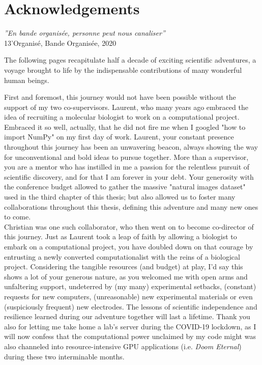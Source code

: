 \chapter*{Acknowledgements}
\begin{flushright}
    \textit{''En bande organisée, personne peut nous canaliser''}\\
    13'Organisé, Bande Organisée, 2020
\end{flushright}
The following pages recapitulate half a decade of exciting scientific adventures, a voyage brought to life by the indispensable contributions of many wonderful human beings.

First and foremost, this journey would not have been possible without the support of my two co-supervisors. Laurent, who many years ago embraced the idea of recruiting a molecular biologist to work on a computational project. Embraced it so well, actually, that he did not fire me when I googled "how to import NumPy" on my first day of work. Laurent, your constant presence throughout this journey has been an unwavering beacon, always showing the way for unconventional and bold ideas to pursue together. More than a supervisor, you are a mentor who has instilled in me a passion for the relentless pursuit of scientific discovery, and for that I am forever in your debt. Your generosity with the conference budget allowed to gather the massive "natural images dataset" used in the third chapter of this thesis; but also allowed us to foster many collaborations throughout this thesis, defining this adventure and many new ones to come.\\
Christian was one such collaborator, who then went on to become co-director of this journey. Just as Laurent took a leap of faith by allowing a biologist to embark on a computational project, you have doubled down on that courage by entrusting a newly converted computationalist with the reins of a biological project. Considering the tangible resources (and budget) at play, I'd say this shows a lot of your generous nature, as you welcomed me with open arms and unfaltering support, undeterred by (my many) experimental setbacks, (constant) requests for new computers, (unreasonable) new experimental materials or even (suspiciously frequent) new electrodes. The lessons of scientific independence and resilience learned during our adventure together will last a lifetime. Thank you also for letting me take home a lab's server during the COVID-19 lockdown, as I will now confess that the computational power unclaimed by my code might was also channeled into resource-intensive GPU applications (i.e. \textit{Doom Eternal}) during these two interminable months.
